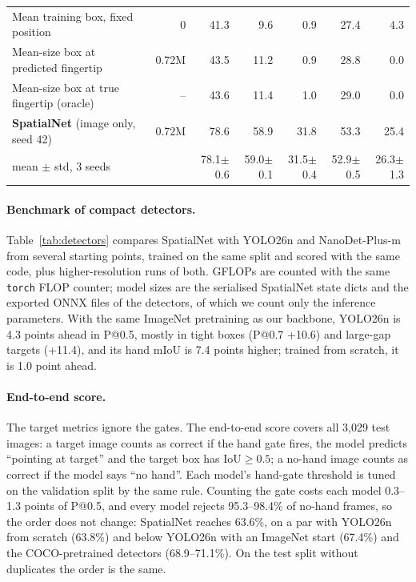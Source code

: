 \begin{table}[h]
\begin{tabular}{lrrrrrr}
    \quad Mean training box, fixed position & 0 & 41.3 & 9.6 & 0.9 & 27.4 & 4.3 \\
    \quad Mean-size box at predicted fingertip & 0.72M & 43.5 & 11.2 & 0.9 & 28.8 & 0.0 \\
    \quad Mean-size box at true fingertip (oracle) & -- & 43.6 & 11.4 & 1.0 & 29.0 & 0.0 \\
    \midrule
    \textbf{SpatialNet} (image only, seed 42) & 0.72M & 78.6 & 58.9 & 31.8 & 53.3 & 25.4 \\
    \quad mean $\pm$ std, 3 seeds & & 78.1{\scriptsize$\pm$0.6} & 59.0{\scriptsize$\pm$0.1} & 31.5{\scriptsize$\pm$0.4} & 52.9{\scriptsize$\pm$0.5} & 26.3{\scriptsize$\pm$1.3} \\
    \bottomrule
  \end{tabular}
\end{table}

\paragraph{Benchmark of compact detectors.} Table~\ref{tab:detectors} compares SpatialNet with YOLO26n and NanoDet-Plus-m from several starting points, trained on the same split and scored with the same code, plus higher-resolution runs of both.  GFLOPs are counted with the same \texttt{torch} FLOP counter; model sizes are the serialised SpatialNet state dicts and the exported ONNX files of the detectors, of which we count only the inference parameters. With the same ImageNet pretraining as our backbone, YOLO26n is 4.3 points ahead in P@0.5, mostly in tight boxes (P@0.7 +10.6) and large-gap targets (+11.4), and its hand mIoU is 7.4 points higher; trained from scratch, it is 1.0 point ahead.

\paragraph{End-to-end score.} The target metrics ignore the gates. The end-to-end score covers all 3,029 test images: a target image counts as correct if the hand gate fires, the model predicts ``pointing at target'' and the target box has IoU${\geq}0.5$; a no-hand image counts as correct if the model says ``no hand''. Each model's hand-gate threshold is tuned on the validation split by the same rule. Counting the gate costs each model 0.3--1.3 points of P@0.5, and every model rejects 95.3--98.4\% of no-hand frames, so the order does not change: SpatialNet reaches 63.6\%, on a par with YOLO26n from scratch (63.8\%) and below YOLO26n with an ImageNet start (67.4\%) and the COCO-pretrained detectors (68.9--71.1\%). On the test split without duplicates the order is the same.

